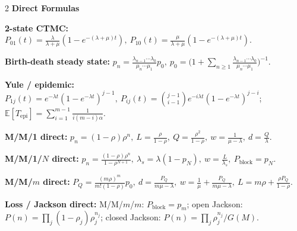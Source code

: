 \documentclass[10pt,fleqn]{article}
\newcommand{\E}{\mathbb{E}}
\newcommand{\shead}[1]{\vspace{0.05ex}\textbf{\scriptsize #1}\par}
\newcommand{\qa}[2]{\textbf{#1} #2\par}
\begin{document}
\begin{multicols*}{2}
\shead{Direct Formulas}
\qa{2-state CTMC:}{\(P_{01}(t)=\frac{\lambda}{\lambda+\mu}(1-e^{-(\lambda+\mu)t}),\ P_{10}(t)=\frac{\mu}{\lambda+\mu}(1-e^{-(\lambda+\mu)t})\).}
\qa{Birth-death steady state:}{\(p_n=\frac{\lambda_{n-1}\cdots\lambda_0}{\mu_n\cdots\mu_1}p_0,\ p_0=\Big(1+\sum_{n\ge1}\frac{\lambda_{n-1}\cdots\lambda_0}{\mu_n\cdots\mu_1}\Big)^{-1}\).}
\qa{Yule / epidemic:}{\(P_{1j}(t)=e^{-\lambda t}(1-e^{-\lambda t})^{j-1},\ P_{ij}(t)=\binom{j-1}{i-1}e^{-i\lambda t}(1-e^{-\lambda t})^{j-i}\); \(\E[T_{\text{epi}}]=\sum_{i=1}^{m-1}\frac{1}{i(m-i)\alpha}\).}
\qa{M/M/1 direct:}{\(p_n=(1-\rho)\rho^n,\ L=\frac{\rho}{1-\rho},\ Q=\frac{\rho^2}{1-\rho},\ w=\frac1{\mu-\lambda},\ d=\frac{Q}{\lambda}\).}
\qa{M/M/1/\(N\) direct:}{\(p_n=\frac{(1-\rho)\rho^n}{1-\rho^{N+1}},\ \lambda_s=\lambda(1-p_N),\ w=\frac{L}{\lambda_s},\ P_{\text{block}}=p_N\).}
\qa{M/M/\(m\) direct:}{\(P_Q=\frac{(m\rho)^m}{m!(1-\rho)}p_0,\ d=\frac{P_Q}{m\mu-\lambda},\ w=\frac1\mu+\frac{P_Q}{m\mu-\lambda},\ L=m\rho+\frac{\rho P_Q}{1-\rho}\).}
\qa{Loss / Jackson direct:}{M/M/\(m\)/\(m\): \(P_{\text{block}}=p_m\); open Jackson: \(P(n)=\prod_j(1-\rho_j)\rho_j^{n_j}\); closed Jackson: \(P(n)=\prod_j\rho_j^{n_j}/G(M)\).}


\end{multicols*}
\end{document}
